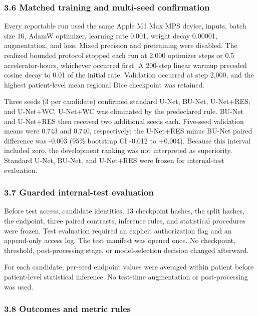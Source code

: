 \documentclass[
  10pt,
  letterpaper,
]{article}
\begin{document}
\subsubsection{3.6 Matched training and multi-seed
confirmation}\label{matched-training-and-multi-seed-confirmation}

Every reportable run used the same Apple M1 Max MPS device, inputs,
batch size 16, AdamW optimizer, learning rate 0.001, weight decay
0.00001, augmentation, and loss. Mixed precision and pretraining were
disabled. The realized bounded protocol stopped each run at 2,000
optimizer steps or 0.5 accelerator-hours, whichever occurred first. A
200-step linear warmup preceded cosine decay to 0.01 of the initial
rate. Validation occurred at step 2,000, and the highest patient-level
mean regional Dice checkpoint was retained.

Three seeds (3 per candidate) confirmed standard U-Net, BU-Net,
U-Net+RES, and U-Net+WC. U-Net+WC was eliminated by the predeclared
rule. BU-Net and U-Net+RES then received two additional seeds each.
Five-seed validation means were 0.743 and 0.740, respectively; the
U-Net+RES minus BU-Net paired difference was -0.003 (95\% bootstrap CI
-0.012 to +0.004). Because this interval included zero, the development
ranking was not interpreted as superiority. Standard U-Net, BU-Net, and
U-Net+RES were frozen for internal-test evaluation.

\subsubsection{3.7 Guarded internal-test
evaluation}\label{guarded-internal-test-evaluation}

Before test access, candidate identities, 13 checkpoint hashes, the
split hashes, the endpoint, three paired contrasts, inference rules, and
statistical procedures were frozen. Test evaluation required an explicit
authorization flag and an append-only access log. The test manifest was
opened once. No checkpoint, threshold, post-processing stage, or
model-selection decision changed afterward.

For each candidate, per-seed endpoint values were averaged within
patient before patient-level statistical inference. No test-time
augmentation or post-processing was used.

\subsubsection{3.8 Outcomes and metric
rules}\label{outcomes-and-metric-rules}
\end{document}
